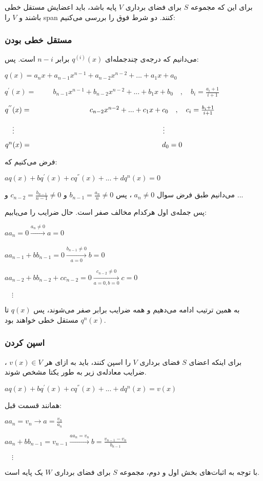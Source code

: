 برای این که مجموعه 
$S$
برای فضای برداری
$V$
پایه باشد، باید اعضایش مستقل خطی باشند و 
$V$
را span کنند.
دو شرط فوق را بررسی می‌کنیم:

\subsubsection*{مستقل خطی بودن}

می‌دانیم که درجه‌ی چندجمله‌ای 
$q^{(i)}(x)$
برابر
$n-i$
است. پس:

\setLTR
$q(x)=a_{n}x+a_{n-1}x^{n-1}+a_{n-2}x^{n-2}+...+a_{1}x+a_{0}$

$q^{'}(x)= \hspace{1cm} b_{n-1}x^{n-1}+b_{n-2}x^{n-2}+...+b_{1}x+b_{0} \quad,\quad b_{i}=\frac{a_{i}+1}{i+1}
$

$q^{''}(x)= \hspace{2.85cm} c_{n-2}x^{n-2}+...+c_{1}x+c_{0} \quad,\quad c_{i}=\frac{b_{i}+1}{i+1}
$

$\quad \vdots  \hspace{7.3cm} \vdots $

$q^{n}(x)= \hspace{6.4cm} d_{0} =0
$
\setRTL

فرض می‌کنیم که:

\setLTR
$aq(x)+bq^{'}(x)+cq^{''}(x)+...+dq^{n}(x)=0$
\setRTL

می‌دانیم طبق فرض سوال 
$a_{n}\neq0$
، پس 
$b_{n-1}=\frac{a_{n}}{n}\neq0$
و 
$c_{n-2}=\frac{b_{n-1}}{n-1}\neq0$
و ...

پس جمله‌ی اول هرکدام مخالف صفر است. حال ضرایب را می‌یابیم:

\setLTR
$aa_{n}=0\xrightarrow[]{a_{n}\neq0} a=0$

$aa_{n-1}+bb_{n-1}=0\xrightarrow[a=0]{b_{n-1}\neq0} b=0$

$aa_{n-2}+bb_{n-2}+cc_{n-2}=0\xrightarrow[a=0,b=0]{c_{n-2}\neq0} c=0$

$\quad \vdots    $
\setRTL

به همین ترتیب ادامه می‌دهیم و همه ضرایب برابر صفر می‌شوند، پس 
$q(x)$
تا 
$q^{n}(x)$
مستقل خطی خواهند بود.

\subsubsection*{اسپن کردن}

برای اینکه اعضای 
$S$
فضای برداری 
$V$
را اسپن کنند، باید به ازای هر 
$v(x) \in V$
، ضرایب معادله‌ی زیر به طور یکتا مشخص شوند.

\setLTR
$aq(x)+bq^{'}(x)+cq^{''}(x)+...+dq^{n}(x)=v(x)$
\setRTL

همانند قسمت قبل:

\setLTR
$aa_{n}=v_{n}\rightarrow a=\frac{v_{n}}{a_{n}}$

$aa_{n}+bb_{n-1}=v_{n-1} \xrightarrow[]{aa_{n}=v_{n}} b = \frac{v_{n-1}-v_{n}}{b_{n-1}}$

$\quad \vdots  $
\setRTL

با توجه به اثبات‌های بخش اول و دوم، مجموعه 
$S$
برای فضای برداری 
$W$
یک پایه است.
